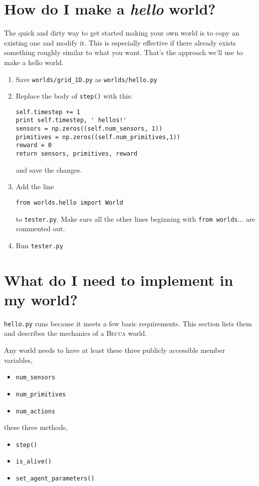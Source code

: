 \section{How do I make a {\em hello} world?}

The quick and dirty way to get started making your own world is to copy an existing one and modify it. This is especially effective if there already exists something roughly similar to what you want. That's the approach we'll use to make a hello world.

\begin{enumerate}
\item{Save \texttt{worlds/grid\_1D.py} as \texttt{worlds/hello.py}}
\item{Replace the body of \texttt{step()} with this:
\begin{verbatim}
self.timestep += 1 
print self.timestep, ' hellos!'
sensors = np.zeros((self.num_sensors, 1))
primitives = np.zeros((self.num_primitives,1))
reward = 0
return sensors, primitives, reward
\end{verbatim}
and save the changes.
}
\item{Add the line 
\begin{verbatim}
from worlds.hello import World
\end{verbatim}
to \texttt{tester.py}. Make sure all the other lines beginning with \texttt{from worlds}...  are commented out.
}
\item{Run \texttt{tester.py}}
\end{enumerate}


\section{What do I need to implement in my world?}

\texttt{hello.py} runs because it meets a few basic requirements. This section lists them and describes the mechanics of a \textsc{Becca} world.

Any world needs to have at least these three publicly accessible member variables,

\begin{itemize}
\item{\texttt{num\_sensors}}
\item{\texttt{num\_primitives}}
\item{\texttt{num\_actions}}
\end{itemize}

these three methods,

\begin{itemize}
\item{\texttt{step()}}
\item{\texttt{is\_alive()}}
\item{\texttt{set\_agent\_parameters()}}
\end{itemize}

